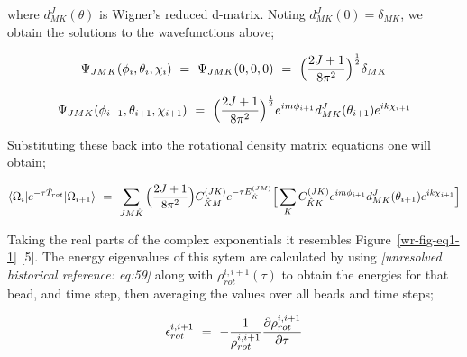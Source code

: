 \documentclass[11pt]{article}
\begin{document}
where \begin{math} d_{MK}^{J} (\theta ) \end{math} is Wigner's reduced d-matrix. Noting \begin{math} d_{MK}^{J} ( 0 ) = \delta_{MK} \end{math}, we obtain the solutions to the wavefunctions above;

\begin{equation}
    \Psi_{JMK} ( \phi_{i} , \theta_{i}, \chi_{i} ) \hspace{0.125cm} = \hspace{0.125cm} \Psi_{JMK} ( 0 , 0 , 0 ) \hspace{0.125cm} = \hspace{0.125cm} \Big( \frac{2 J + 1}{8 \pi^2} \Big)^{\frac{1}{2}} \delta_{MK}
\end{equation}

\begin{equation}
    \Psi_{JMK} ( \phi_{i+1} , \theta_{i+1}, \chi_{i+1} ) \hspace{0.125cm} = \hspace{0.125cm} \Big( \frac{2 J + 1}{8 \pi^2} \Big)^{\frac{1}{2}} e^{i m \phi_{i+1}} d_{MK}^{J} (\theta_{i+1} )  e^{i k \chi_{i+1}}
\end{equation}

Substituting these back into the rotational density matrix equations one will obtain;

\begin{equation}
    \langle \Omega_{i} | e^{- \tau \hat{T}_{rot}} | \Omega_{i+1} \rangle \hspace{0.125cm} = \hspace{0.125cm} \sum_{J M \hat{K}} \Big( \frac{2 J + 1}{8 \pi^2} \Big) C_{\hat{K} M}^{(JK)} e^{- \tau E_{\hat{K}}^{(JM)}} \Big[ \sum_{K} C_{\hat{K} K}^{(JK)} e^{i m \phi_{i+1}} d_{MK}^{J} (\theta_{i+1} )  e^{i k \chi_{i+1}} \Big]
\end{equation}

Taking the real parts of the complex exponentials it resembles Figure~\ref{wr-fig-eq1-1} [5]. The energy eigenvalues of this sytem are calculated by using \textit{[unresolved historical reference: eq:59]} along with \begin{math} \rho_{rot}^{i, i+1} ( \tau ) \end{math} to obtain the energies for that bead, and time step, then averaging the values over all beads and time steps;

\begin{equation}
     \epsilon_{rot}^{i, i+1} \hspace{0.125cm} = \hspace{0.125cm} - \frac{1}{\rho_{rot}^{i, i+1}} \frac{\partial{\rho_{rot}^{i, i+1}}}{\partial{\tau}} 
\end{equation}
\end{document}
